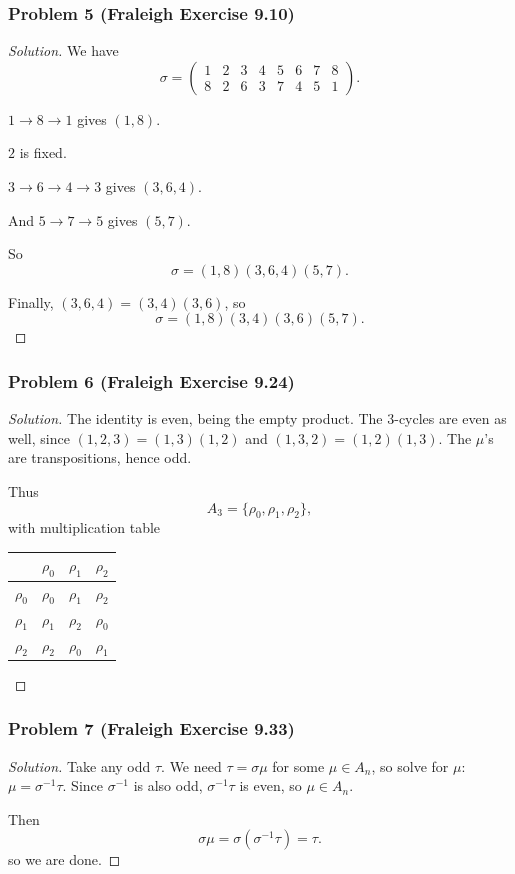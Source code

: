 \documentclass[11pt]{article}
\newcommand{\1}{\mathbf{1}}
\theoremstyle{definition}
\newenvironment{solution}{\begin{proof}[Solution]}{\end{proof}}
\begin{document}
\subsubsection*{Problem 5 (Fraleigh Exercise 9.10)}
\begin{solution}
    We have 
    $$\sigma = \begin{pmatrix}
    1 & 2 & 3 & 4 & 5 & 6 & 7 & 8\\
    8 & 2 & 6 & 3 & 7 & 4 & 5 & 1
    \end{pmatrix}.$$
    \par $1 \to 8 \to 1$ gives $(1,8)$.
    \par $2$ is fixed.
    \par $3 \to 6 \to 4 \to 3$ gives $(3,6,4)$.
    \par And $5 \to 7 \to 5$ gives $(5,7)$.
    \par So
    $$\sigma = (1,8)(3,6,4)(5,7).$$
    \par Finally, $(3,6,4) = (3,4)(3,6)$, so
    $$\sigma = (1,8)(3,4)(3,6)(5,7).$$
\end{solution}
\subsubsection*{Problem 6 (Fraleigh Exercise 9.24)}
\begin{solution}
    \par The identity is even, being the empty product. The $3$-cycles are even as well,
    since $(1,2,3) = (1,3)(1,2)$ and $(1,3,2) = (1,2)(1,3)$. The $\mu$'s are transpositions,
    hence odd.
    \par Thus
    $$A_3 = \{\rho_0, \rho_1, \rho_2\},$$
    with multiplication table
    \begin{center}
    \begin{tabular}{c|ccc}
             & $\rho_0$ & $\rho_1$ & $\rho_2$ \\ \hline
    $\rho_0$ & $\rho_0$ & $\rho_1$ & $\rho_2$ \\
    $\rho_1$ & $\rho_1$ & $\rho_2$ & $\rho_0$ \\
    $\rho_2$ & $\rho_2$ & $\rho_0$ & $\rho_1$
    \end{tabular}
    \end{center}
\end{solution}
\subsubsection*{Problem 7 (Fraleigh Exercise 9.33)}
\begin{solution}
    Take any odd $\tau$. We need $\tau = \sigma\mu$ for some $\mu \in A_n$, so solve for
    $\mu$: $\mu = \sigma^{-1}\tau$. Since $\sigma^{-1}$ is also odd, $\sigma^{-1}\tau$ is
    even, so $\mu \in A_n$.
    \par Then
    $$\sigma\mu = \sigma(\sigma^{-1}\tau) = \tau.$$
    so we are done.
\end{solution}
\end{document}
